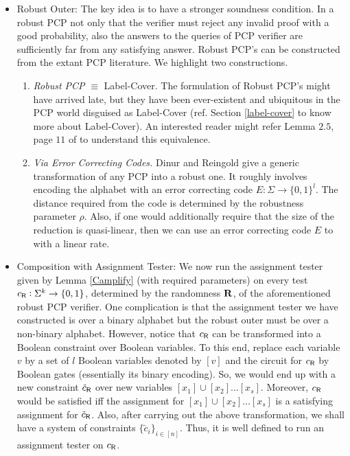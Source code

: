 \begin{itemize}
\item {\sf Robust Outer:} The key idea is to have a stronger soundness
  condition. In a robust PCP not only that the verifier must reject
  any invalid proof with a good probability, also the answers to the
  queries of PCP verifier are sufficiently far from any satisfying
  answer.  Robust PCP's can be constructed from the extant PCP
  literature. We highlight two constructions.
\begin{enumerate}
\item {\em Robust PCP} $\equiv$ {\sc Label-Cover}.  The formulation of
  Robust PCP's might have arrived late, but they have been
  ever-existent and ubiquitous in the PCP world disguised as {\sc
    Label-Cover} (ref. Section \ref{label-cover} to know more about
  {\sc Label-Cover}).  An interested reader might refer Lemma $2.5$,
  page $11$ of \cite{DH} to understand this equivalence.


\item {\em Via Error Correcting Codes.} Dinur and Reingold \cite{DR}
  give a generic transformation of any PCP into a robust one. It
  roughly involves encoding the alphabet with an error correcting code
  $E: \Sigma \rightarrow \{0,1\}^l$. The distance required from the
  code is determined by the robustness parameter $\rho$. Also, if one
  would additionally require that the size of the reduction is
  quasi-linear, then we can use an error correcting code $E$ to
  with a linear rate.
\end{enumerate}

\item {\sf Composition with Assignment Tester:} We now run the
  assignment tester given by Lemma \ref{Camplify} (with required
  parameters) on every test $c_{\sf R} : \Sigma^k \rightarrow
  \{0,1\}$, determined by the randomness ${\bf R}$, of the
  aforementioned robust PCP verifier. One complication is that the assignment tester
  we have constructed is over a binary alphabet but the robust outer must be over 
  a non-binary alphabet. However, notice that $c_{\sf R}$ can be
  transformed into a Boolean constraint over Boolean variables. To
  this end, replace each variable $v$ by a set of $l$ Boolean
  variables denoted by $[v]$ and the circuit for $c_{\sf R}$ by Boolean gates
  (essentially its binary encoding).  So, we would end up with a new
  constraint $\tilde{c}_{\sf R}$ over new variables $[x_1] \cup [x_2] \ldots
  [x_s]$. Moreover, $c_{\sf R}$ would be satisfied iff the assignment for $[x_1] \cup
  [x_2] \ldots [x_s]$ is a satisfying assignment for $\tilde{c}_{\sf R}$. Also, after
  carrying out the above transformation, we shall have a system of
  constraints $\{\tilde{c}_i\}_{i \in [n]}$.  Thus, it is well defined
  to run an assignment tester on ${c_{\sf R}}$.


\end{itemize}
